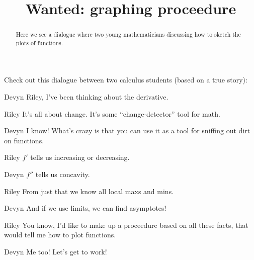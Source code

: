 \documentclass{ximera}
\title[Break-Ground:]{Wanted: graphing proceedure}
\begin{document}
\begin{abstract}
Here we see a dialogue where two young mathematicians discussing how
to sketch the plots of functions.
\end{abstract}
\maketitle

Check out this dialogue between two calculus students (based on a true
story):

\begin{dialogue}
\item[Devyn] Riley, I've been thinking about the derivative. 
\item[Riley] It's all about change. It's some ``change-detector'' tool
  for math.
\item[Devyn] I know!  What's crazy is that you can use it as a tool
  for sniffing out dirt on functions.
\item[Riley] $f'$ tells us increasing or decreasing.
\item[Devyn] $f''$ tells us concavity.
\item[Riley] From just that we know all local maxs and mins.
\item[Devyn] And if we use limits, we can find asymptotes!
\item[Riley] You know, I'd like to make up a proceedure based on all
  these facts, that would tell me how to plot functions.
\item[Devyn] Me too! Let's get to work!
\end{dialogue}





\end{document}

